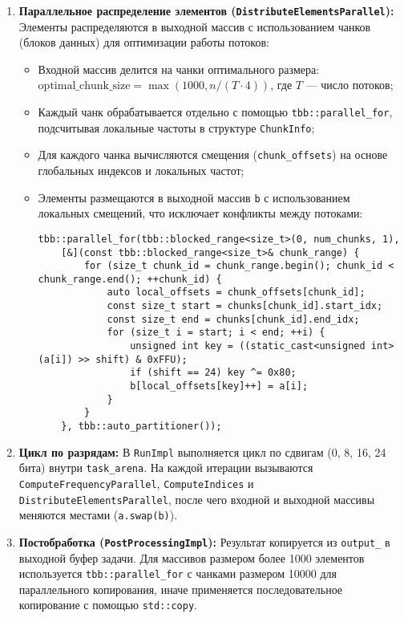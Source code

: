\documentclass[12pt]{article}
\begin{document}
\begin{enumerate}
  \item \textbf{Параллельное распределение элементов (\texttt{DistributeElementsParallel}):}
  Элементы распределяются в выходной массив с использованием чанков (блоков данных) для оптимизации работы потоков:
  \begin{itemize}
    \item Входной массив делится на чанки оптимального размера: $\text{optimal\_chunk\_size} = \max(1000, n / (T \cdot 4))$, где $T$ — число потоков;
    \item Каждый чанк обрабатывается отдельно с помощью \texttt{tbb::parallel\_for}, подсчитывая локальные частоты в структуре \texttt{ChunkInfo};
    \item Для каждого чанка вычисляются смещения (\texttt{chunk\_offsets}) на основе глобальных индексов и локальных частот;
    \item Элементы размещаются в выходной массив \texttt{b} с использованием локальных смещений, что исключает конфликты между потоками:
    \begin{lstlisting}
tbb::parallel_for(tbb::blocked_range<size_t>(0, num_chunks, 1),
    [&](const tbb::blocked_range<size_t>& chunk_range) {
        for (size_t chunk_id = chunk_range.begin(); chunk_id < chunk_range.end(); ++chunk_id) {
            auto local_offsets = chunk_offsets[chunk_id];
            const size_t start = chunks[chunk_id].start_idx;
            const size_t end = chunks[chunk_id].end_idx;
            for (size_t i = start; i < end; ++i) {
                unsigned int key = ((static_cast<unsigned int>(a[i]) >> shift) & 0xFFU);
                if (shift == 24) key ^= 0x80;
                b[local_offsets[key]++] = a[i];
            }
        }
    }, tbb::auto_partitioner());
    \end{lstlisting}
  \end{itemize}

  \item \textbf{Цикл по разрядам:}
  В \texttt{RunImpl} выполняется цикл по сдвигам (0, 8, 16, 24 бита) внутри \texttt{task\_arena}. На каждой итерации вызываются \texttt{ComputeFrequencyParallel}, \texttt{ComputeIndices} и \texttt{DistributeElementsParallel}, после чего входной и выходной массивы меняются местами (\texttt{a.swap(b)}).

  \item \textbf{Постобработка (\texttt{PostProcessingImpl}):}
  Результат копируется из \texttt{output\_} в выходной буфер задачи. Для массивов размером более 1000 элементов используется \texttt{tbb::parallel\_for} с чанками размером 10000 для параллельного копирования, иначе применяется последовательное копирование с помощью \texttt{std::copy}.
\end{enumerate}
\end{document}
